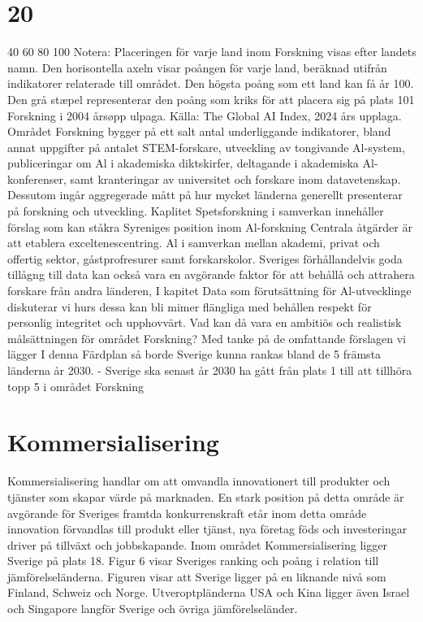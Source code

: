 {{{{{\section*{20}
40
60
80
100
Notera: Placeringen för varje land inom Forskning visas efter landets namn. Den horisontella axeln visar poången för varje land, beräknad utifrån indikatorer relaterade till området. Den högsta poång som ett land kan få år 100. Den grå stæpel representerar den poång som kriks för att placera sig på plats 101 Forskning i 2004 årsøpp ulpaga.
Källa: The Global AI Index, 2024 års upplaga.
Området Forskning bygger på ett salt antal underliggande indikatorer, bland annat uppgifter på antalet STEM-forskare, utveckling av tongivande Al-system, publiceringar om Al i akademiska diktskirfer, deltagande i akademiska Al-konferenser, samt kranteringar av universitet och forskare inom datavetenskap. Dessutom ingår aggregerade mått på hur mycket länderna generellt presenterar på forskning och utveckling.
Kaplitet Spetsforskning i samverkan innehåller förslag som kan ståkra Syreniges position inom Al-forskning Centrala åtgärder är att etablera exceltenescentring. Al i samverkan mellan akademi, privat och offertig sektor, gåstprofresurer samt forskarskolor. Sveriges förhållandelvis goda tillågng till data kan också vara en avgörande faktor för att behållå och attrahera forskare från andra länderen, I kapitet Data som förutsättning för Al-utvecklinge diskuterar vi hurs dessa kan bli mimer flängliga med behållen respekt för personlig integritet och upphovvärt.
Vad kan då vara en ambitiös och realistisk målsättningen för området Forskning? Med tanke på de omfattande förslagen vi lägger I denna Färdplan så borde Sverige kunna rankas bland de 5 främsta länderna år 2030.
- Sverige ska senast år 2030 ha gått från plats 1 till att tillhöra topp 5 i området Forskning
\section*{Kommersialisering}
Kommersialisering handlar om att omvandla innovationert till produkter och tjänster som skapar värde på marknaden. En stark position på detta område är avgörande för Sveriges framtda konkurrenskraft etår inom detta område innovation förvandlas till produkt eller tjänst, nya företag föds och investeringar driver på tillväxt och jobbskapande. Inom området Kommersialisering ligger Sverige på plats 18.
Figur 6 visar Sveriges ranking och poång i relation till jämförelseländerna. Figuren visar att Sverige ligger på en liknande nivå som Finland, Schweiz och Norge. Utveroptpländerna USA och Kina ligger även Israel och Singapore langför Sverige och övriga jämförelseländer.

}}}}}
